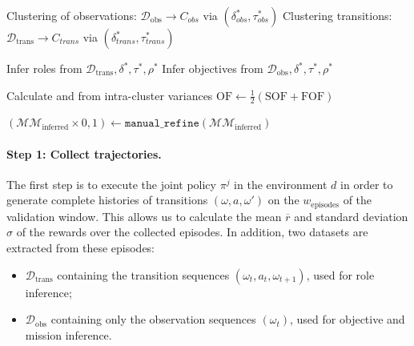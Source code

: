 \begin{itemize}
\begin{algorithm}[h!]
  Clustering of observations: $\mathcal{D}_{\text{obs}} \rightarrow C_{obs}$ via $(\delta_{obs}^*, \tau_{obs}^*)$ \;
  Clustering transitions: $\mathcal{D}_{\text{trans}} \rightarrow C_{trans}$ via $(\delta_{trans}^*, \tau_{trans}^*)$ \;


    Infer roles from $\mathcal{D}_{\text{trans}}, \delta^*, \tau^*, \rho^*$ \;
    Infer objectives from $\mathcal{D}_{\text{obs}}, \delta^*, \tau^*, \rho^*$ \;

    Calculate  and  from intra-cluster variances \;
  $\text{OF} \gets \frac{1}{2}(\text{SOF} + \text{FOF})$ \;

  $(\mathcal{MM}_{\text{inferred}} \times {0,1}) \gets \texttt{manual\_refine}(\mathcal{MM}_{\text{inferred}})$

\end{algorithm}



\paragraph{Step 1: Collect trajectories.}
The first step is to execute the joint policy $\pi^j$ in the environment $d$ in order to generate complete histories of transitions $(\omega, a, \omega')$ on the $w_{\text{episodes}}$ of the validation window. This allows us to calculate the mean $\overline{r}$ and standard deviation $\sigma$ of the rewards over the collected episodes.
In addition, two datasets are extracted from these episodes:
\begin{itemize}
  \item $\mathcal{D}_{\text{trans}}$ containing the transition sequences $(\omega_t, a_t, \omega_{t+1})$, used for role inference;
  \item $\mathcal{D}_{\text{obs}}$ containing only the observation sequences $(\omega_t)$, used for objective and mission inference.
\end{itemize}


\end{itemize}
